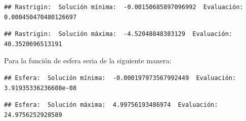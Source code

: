 \documentclass[11pt,]{article}
\newenvironment{Shaded}{\begin{snugshade}}{\end{snugshade}}
\newcommand{\CharTok}[1]{\textcolor[rgb]{0.31,0.60,0.02}{#1}}
\newcommand{\DataTypeTok}[1]{\textcolor[rgb]{0.13,0.29,0.53}{#1}}
\newcommand{\DecValTok}[1]{\textcolor[rgb]{0.00,0.00,0.81}{#1}}
\newcommand{\KeywordTok}[1]{\textcolor[rgb]{0.13,0.29,0.53}{\textbf{#1}}}
\newcommand{\NormalTok}[1]{#1}
\newcommand{\OperatorTok}[1]{\textcolor[rgb]{0.81,0.36,0.00}{\textbf{#1}}}
\newcommand{\StringTok}[1]{\textcolor[rgb]{0.31,0.60,0.02}{#1}}
\begin{document}
\begin{verbatim}
## Rastrigin:  Solución mínima:  -0.00150685897096992  Evaluación:  0.000450470480126697
\end{verbatim}

\begin{Shaded}
\end{Shaded}

\begin{verbatim}
## Rastrigin:  Solución máxima:  -4.52048848383129  Evaluación:  40.3520696513191
\end{verbatim}

Para la función de esfera seria de la siguiente manera:

\begin{Shaded}
\end{Shaded}

\begin{verbatim}
## Esfera:  Solución mínima:  -0.000197973567992449  Evaluación:  3.91935336236608e-08
\end{verbatim}

\begin{Shaded}
\end{Shaded}

\begin{verbatim}
## Esfera:  Solución máxima:  4.99756193486974  Evaluación:  24.9756252928589
\end{verbatim}

\newpage
\singlespacing 
\end{document}
